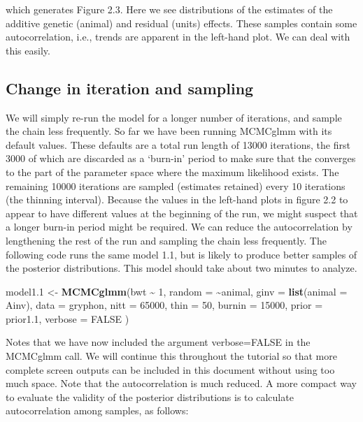 \documentclass[
  12pt,
]{book}
\newenvironment{Shaded}{\begin{snugshade}}{\end{snugshade}}
\newcommand{\DataTypeTok}[1]{\textcolor[rgb]{0.13,0.29,0.53}{#1}}
\newcommand{\DecValTok}[1]{\textcolor[rgb]{0.00,0.00,0.81}{#1}}
\newcommand{\FloatTok}[1]{\textcolor[rgb]{0.00,0.00,0.81}{#1}}
\newcommand{\KeywordTok}[1]{\textcolor[rgb]{0.13,0.29,0.53}{\textbf{#1}}}
\newcommand{\NormalTok}[1]{#1}
\newcommand{\OperatorTok}[1]{\textcolor[rgb]{0.81,0.36,0.00}{\textbf{#1}}}
\newcommand{\OtherTok}[1]{\textcolor[rgb]{0.56,0.35,0.01}{#1}}
\newcommand{\StringTok}[1]{\textcolor[rgb]{0.31,0.60,0.02}{#1}}
\begin{document}
which generates Figure 2.3. Here we see distributions of the estimates of the additive genetic (animal) and residual (units) effects. These samples contain some autocorrelation, i.e., trends are apparent in the left-hand plot. We can deal with this easily.

\hypertarget{change-in-iteration-and-sampling}{%
\subsection{Change in iteration and sampling}\label{change-in-iteration-and-sampling}}

We will simply re-run the model for a longer number of iterations, and sample the chain less frequently. So far we have been running MCMCglmm with its default values. These defaults are a total run length of 13000 iterations, the first 3000 of which are discarded as a `burn-in' period to make sure that the converges to the part of the parameter space where the maximum likelihood exists. The remaining 10000 iterations are sampled (estimates retained) every 10 iterations (the thinning interval). Because the values in the left-hand plots in figure 2.2 to appear to have different values at the beginning of the run, we might suspect that a longer burn-in period might be required. We can reduce the autocorrelation by lengthening the rest of the run and sampling the chain less frequently. The following code runs the same model 1.1, but is likely to produce better samples of the posterior distributions. This model should take about two minutes to analyze.

\begin{Shaded}
\begin{Highlighting}[]
\NormalTok{model1}\FloatTok{.1}\NormalTok{ \textless{}{-}}\StringTok{ }\KeywordTok{MCMCglmm}\NormalTok{(bwt }\OperatorTok{\textasciitilde{}}\StringTok{ }\DecValTok{1}\NormalTok{,}
  \DataTypeTok{random =} \OperatorTok{\textasciitilde{}}\NormalTok{animal, }\DataTypeTok{ginv =} \KeywordTok{list}\NormalTok{(}\DataTypeTok{animal =}\NormalTok{ Ainv),}
  \DataTypeTok{data =}\NormalTok{ gryphon, }\DataTypeTok{nitt =} \DecValTok{65000}\NormalTok{, }\DataTypeTok{thin =} \DecValTok{50}\NormalTok{, }\DataTypeTok{burnin =} \DecValTok{15000}\NormalTok{,}
  \DataTypeTok{prior =}\NormalTok{ prior1}\FloatTok{.1}\NormalTok{, }\DataTypeTok{verbose =} \OtherTok{FALSE}
\NormalTok{)}
\end{Highlighting}
\end{Shaded}

Notes that we have now included the argument verbose=FALSE in the MCMCglmm call. We will continue this throughout the tutorial so that more complete screen outputs can be included in this document without using too much space. Note that the autocorrelation is much reduced. A more compact way to evaluate the validity of the posterior distributions is to calculate autocorrelation among samples, as follows:
\end{document}

